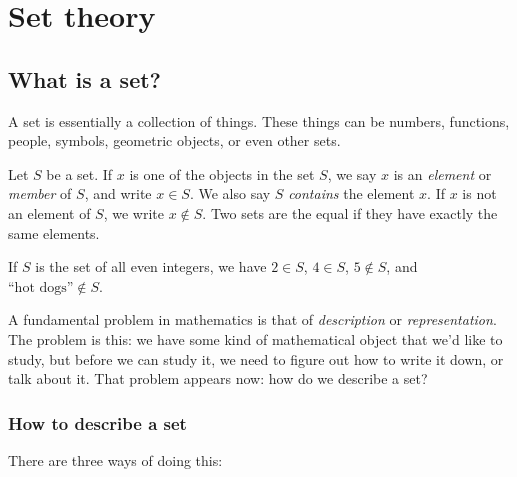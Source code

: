 \documentclass{tufte-book}
\begin{document}

\chapter{Set theory}
\label{cha:set-theory}

\section{What is a set?}
\label{sec:what-set}

A set is essentially a collection of things. These things can be numbers, functions, people, symbols, geometric objects, or even other sets. 

\begin{definition}
  Let $S$ be a set. If $x$ is one of the objects in the set $S$, we say $x$ is an \emph{element} or \emph{member} of $S$, and write $x \in S$. We also say $S$ \emph{contains} the element $x$. If $x$ is not an element of $S$, we write $x \notin S$. Two sets are the equal if they have exactly the same elements.
\end{definition}

If $S$ is the set of all even integers, we have $2 \in S$, $4 \in S$, $5 \notin S$, and $\text{``hot dogs''} \notin S$.

A fundamental problem in mathematics is that of \emph{description} or \emph{representation}. The problem is this: we have some kind of mathematical object that we'd like to study, but before we can study it, we need to figure out how to write it down, or talk about it. That problem appears now: how do we describe a set?

\subsection{How to describe a set}
\label{sec:how-describe-set}

There are three ways of doing this:
\end{document}
